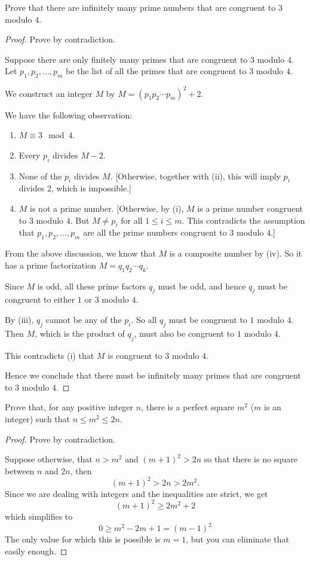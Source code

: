 \begin{prbm}
Prove that there are infinitely many prime numbers that are congruent to $3$ modulo $4$.
\end{prbm}

\begin{proof}
Prove by contradiction.

Suppose there are only finitely many primes that are congruent to $3$ modulo $4$. Let $p_1,p_2,\dots,p_m$ be the list of all the primes that are congruent to $3$ modulo $4$.

We construct an integer $M$ by $M=(p_1p_2\cdots p_m)^2+2$.

We have the following observation:
\begin{enumerate}[label=(\roman*)]
\item  $M\equiv 3 \mod 4$.
\item Every $p_i$ divides $M-2$.
\item None of the $p_i$ divides $M$. [Otherwise, together with (ii), this will imply $p_i$ divides $2$, which is impossible.]
\item $M$ is not a prime number. [Otherwise, by (i), $M$ is a prime number congruent to $3$ modulo $4$. But $M\neq p_i$ for all $1\le i\le m$. This contradicts the assumption that $p_1,p_2,\dots,p_m$ are all the prime numbers congruent to $3$ modulo $4$.]
\end{enumerate}

From the above discussion, we know that $M$ is a composite number by (iv). So it has a prime factorization $M=q_1q_2\cdots q_k$.

Since $M$ is odd, all these prime factors $q_j$ must be odd, and hence $q_j$ must be congruent to either $1$ or $3$ modulo $4$.

By (iii), $q_j$ cannot be any of the $p_i$. So all $q_j$ must be congruent to $1$ modulo $4$. Then $M$, which is the product of $q_j$, must also be congruent to $1$ modulo $4$.

This contradicts (i) that $M$ is congruent to $3$ modulo $4$.

Hence we conclude that there must be infinitely many primes that are congruent to $3$ modulo $4$.
\end{proof}

\begin{prbm}
Prove that, for any positive integer $n$, there is a perfect square $m^2$ ($m$ is an integer) such that $n\le m^2\le 2n$.
\end{prbm}

\begin{proof}
Prove by contradiction.

Suppose otherwise, that $n>m^2$ and $(m+1)^2>2n$ so that there is no square between $n$ and $2n$, then
\[ (m+1)^2>2n>2m^2. \]
Since we are dealing with integers and the inequalities are strict, we get
\[ (m+1)^2\ge2m^2+2 \]
which simplifies to
\[ 0\ge m^2-2m+1=(m-1)^2 \]
The only value for which this is possible is $m=1$, but you can eliminate that easily enough.
\end{proof}


